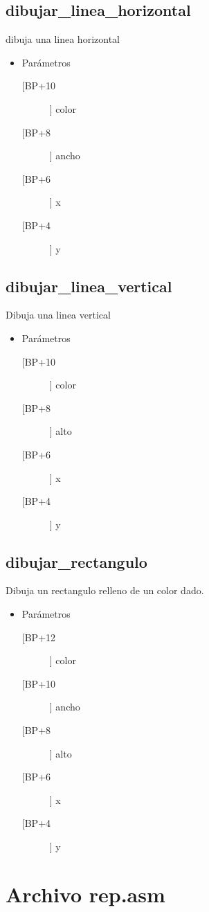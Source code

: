 \subsection{dibujar\_linea\_horizontal}
\label{sec-3-3}
dibuja una linea horizontal
\begin{itemize}
\item Parámetros
\begin{description}
\item[[BP+10]] color
\item[[BP+8]] ancho
\item[[BP+6]] x
\item[[BP+4]] y
\end{description}
\end{itemize}


\subsection{dibujar\_linea\_vertical}
\label{sec-3-4}
Dibuja una linea vertical
\begin{itemize}
\item Parámetros
\begin{description}
\item[[BP+10]] color
\item[[BP+8]] alto
\item[[BP+6]] x
\item[[BP+4]] y
\end{description}
\end{itemize}

\subsection{dibujar\_rectangulo}
\label{sec-3-5}
Dibuja un rectangulo relleno de un color dado.
\begin{itemize}
\item Parámetros
\begin{description}
\item[[BP+12]] color
\item[[BP+10]] ancho
\item[[BP+8]] alto
\item[[BP+6]] x
\item[[BP+4]] y
\end{description}
\end{itemize}

\section{Archivo rep.asm}
\label{sec-4}
